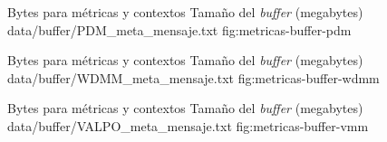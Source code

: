 {
\graficoProtocolo
{Bytes para métricas y contextos}
{Tamaño del \textit{buffer} (megabytes)}
{data/buffer/PDM_meta_mensaje.txt}
}{fig:metricas-buffer-pdm}

{
\graficoProtocolo
{Bytes para métricas y contextos}
{Tamaño del \textit{buffer} (megabytes)}
{data/buffer/WDMM_meta_mensaje.txt}
}{fig:metricas-buffer-wdmm}

{
\graficoProtocolo
{Bytes para métricas y contextos}
{Tamaño del \textit{buffer} (megabytes)}
{data/buffer/VALPO_meta_mensaje.txt}
}{fig:metricas-buffer-vmm}

